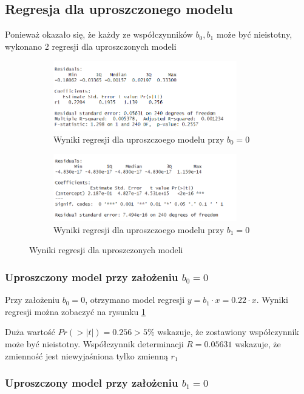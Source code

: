 \documentclass[a4paper,11pt]{article}
\begin{document}
\subsection{Regresja dla uproszczonego modelu}
Ponieważ okazało się, że każdy ze współczynników $b_{0}, b_{1}$ może być nieistotny, wykonano 2 regresji dla uproszczonych modeli

\begin{figure}
  \begin{subfigure}{0.5\textwidth}
    \includegraphics[width=8cm]{regresja_upr1.png}
    \caption{Wyniki regresji dla uproszczoego modelu przy $b_{0}=0$}
    \label{fig:regresja_upr1}
  \end{subfigure}%
  \begin{subfigure}{0.5\textwidth}
    \includegraphics[width=8cm]{regresja_upr2.png}
    \caption{Wyniki regresji dla uproszczoego modelu przy $b_{1}=0$}
    \label{fig:regresja_upr2}
  \end{subfigure}
  \caption{Wyniki regresji dla uproszczonych modeli}
\end{figure}


\subsubsection{Uproszczony model przy założeniu $b_{0}=0$}

Przy założeniu $b_{0}=0$, otrzymano model regresji $y=b_{1}\cdot x = 0.22\cdot x$. Wyniki regresji można zobaczyć na rysunku \ref{fig:regresja_upr1}

Duża wartość $Pr(>|t|) = 0.256 > 5\%$ wskazuje, że zostawiony współczynnik może być nieistotny. Współczynnik determinacji $R=0.05631$ wskazuje, że zmienność jest niewyjaśniona tylko zmienną $r_{1}$

\subsubsection{Uproszczony model przy założeniu $b_{1}=0$}
\end{document}
